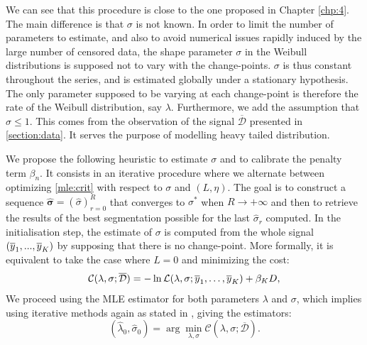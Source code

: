 We can see that this procedure is close to the one proposed in Chapter \ref{chp:4}. The main difference is that $\sigma$ is not known. In order to limit the number of parameters to estimate, and also to avoid numerical issues rapidly induced by the large number of censored data, the shape parameter $\sigma$ in the Weibull distributions is supposed not to vary with the change-points. $\sigma$ is thus constant throughout the series, and is estimated globally under a stationary hypothesis. The only parameter supposed to be varying at each change-point is therefore the rate of the Weibull distribution, say $\lambda$. Furthermore, we add the assumption that $\sigma \leq 1$. This comes from the observation of the signal $\overline{\mathcal{D}}$ presented in \ref{section:data}. It serves the purpose of modelling heavy tailed distribution.  

We propose the following heuristic to estimate $\sigma$ and to calibrate the penalty term $\beta_n$. It consists in an iterative procedure where we alternate between optimizing \ref{mle:crit} with respect to $\sigma$ and $(L,\eta)$. The goal is to construct a sequence $\bm{\widehat{\sigma}} = (\widehat{\sigma})_{r=0}^R$ that converges to $\sigma^*$ when $R \to +\infty$ and then to retrieve the results of the best segmentation possible for the last $\widehat{\sigma}_r$ computed.
In the initialisation step, the estimate of $\sigma$ is computed from the whole signal $(\overline{y}_1,...,\overline{y}_K)$ by supposing that there is no change-point. More formally, it is equivalent to take the case where $L = 0$ and minimizing the cost: 
\begin{equation}\label{heu:init}
\mathcal{C}(\lambda,\sigma;   \overline{\mathcal{D}})= -\ln \mathcal L(\lambda,\sigma; \overline{y}_{1}, \ldots, \overline{y}_{K}) + \beta_K D,
\end{equation}
We proceed using the MLE estimator for both parameters $\lambda$ and $\sigma$, which implies using iterative methods again as stated in \cite{cohen1965maximum}, giving the estimators:
\begin{equation}\label{heu:sigma1}
(\widehat{\lambda}_0, \widehat{\sigma}_0) = \arg \min_{\lambda, \sigma} \mathcal{C}(\lambda, \sigma ;   \overline{\mathcal{D}}).
\end{equation}

